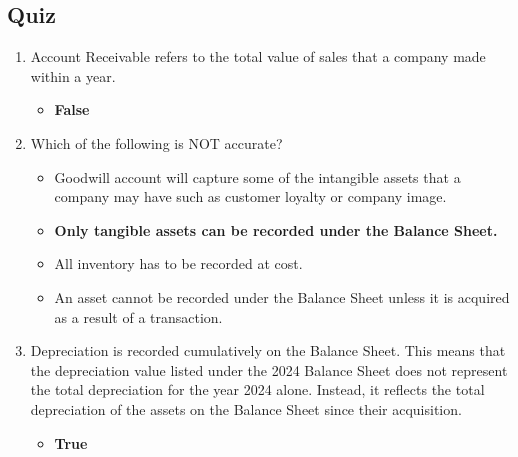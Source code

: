 \begin{tiny}
  \subsection{Quiz}
  \begin{enumerate}[itemsep=-0.5em]
    \item Account Receivable refers to the total value of sales that a company made within a year.
          \begin{itemize}[itemsep=-0.2em]
            \item \textbf{False}
          \end{itemize}
    \item Which of the following is NOT accurate?
          \begin{itemize}[itemsep=-0.2em]
            \item Goodwill account will capture some of the intangible assets that a company may have such as customer loyalty or company image.
            \item \textbf{Only tangible assets can be recorded under the Balance Sheet.}
            \item All inventory has to be recorded at cost.
            \item An asset cannot be recorded under the Balance Sheet unless it is acquired as a result of a transaction.
          \end{itemize}
    \item Depreciation is recorded cumulatively on the Balance Sheet. This means that the depreciation value listed under the 2024 Balance Sheet does not represent the total depreciation for the year 2024 alone. Instead, it reflects the total depreciation of the assets on the Balance Sheet since their acquisition.
          \begin{itemize}[itemsep=-0.2em]
            \item \textbf{True}
          \end{itemize}
  \end{enumerate}

\end{tiny}

